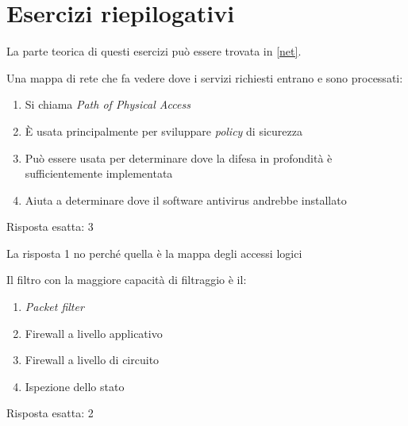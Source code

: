 \section{Esercizi riepilogativi}
\label{EsNetRiep}

La parte teorica di questi esercizi pu\`o essere trovata in \ref{net}.

\begin{Exercise} [
  title={Quiz},
  label={netriep1}
  ]

  \Question Una mappa di rete che fa vedere dove i servizi richiesti entrano
e sono processati:

\begin{enumerate}
 \item Si chiama \textit{Path of Physical Access}
 \item \`E usata principalmente per sviluppare \textit{policy} di sicurezza
 \item Pu\`o essere usata per determinare dove la difesa in profondit\`a \`e
sufficientemente implementata
 \item Aiuta a determinare dove il software antivirus andrebbe installato
\end{enumerate}

\end{Exercise}


\begin{Answer} [
  ref={netriep1},
  number={1}
  ]

  \Question Risposta esatta: 3

  La risposta 1 no perché quella è la mappa degli accessi logici

\end{Answer}



\begin{Exercise} [
  title={Quiz},
  label={netriep2}
  ]

  \Question Il filtro con la maggiore capacit\`a di filtraggio \`e il:
\begin{enumerate}
 \item \textit{Packet filter}
 \item Firewall a livello applicativo
 \item Firewall a livello di circuito
 \item Ispezione dello stato
\end{enumerate}

\end{Exercise}


\begin{Answer} [
  ref={netriep2},
  number={2}
  ]

  \Question Risposta esatta: 2

\end{Answer}

